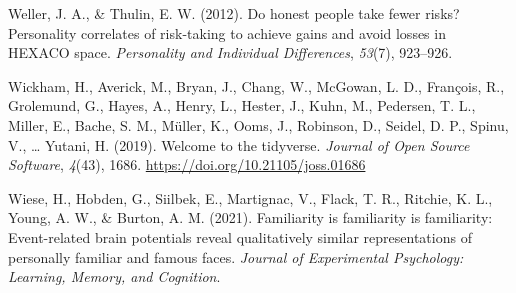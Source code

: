 \documentclass[
  man,floatsintext]{apa6}
\newlength{\cslhangindent}
\newlength{\cslentryspacingunit} %
\newenvironment{CSLReferences}[2] %
 {%
  \setlength{\parindent}{0pt}
  \ifodd #1
  \let\oldpar\par
  \def\par{\hangindent=\cslhangindent\oldpar}
  \fi
  \setlength{\parskip}{#2\cslentryspacingunit}
 }%
 {}
\begin{document}
\begin{CSLReferences}{1}{0}
\leavevmode{}%
Weller, J. A., \& Thulin, E. W. (2012). Do honest people take fewer risks? Personality correlates of risk-taking to achieve gains and avoid losses in HEXACO space. \emph{Personality and Individual Differences}, \emph{53}(7), 923--926.

\leavevmode{}%
Wickham, H., Averick, M., Bryan, J., Chang, W., McGowan, L. D., François, R., Grolemund, G., Hayes, A., Henry, L., Hester, J., Kuhn, M., Pedersen, T. L., Miller, E., Bache, S. M., Müller, K., Ooms, J., Robinson, D., Seidel, D. P., Spinu, V., \ldots{} Yutani, H. (2019). Welcome to the {tidyverse}. \emph{Journal of Open Source Software}, \emph{4}(43), 1686. \url{https://doi.org/10.21105/joss.01686}

\leavevmode{}%
Wiese, H., Hobden, G., Siilbek, E., Martignac, V., Flack, T. R., Ritchie, K. L., Young, A. W., \& Burton, A. M. (2021). Familiarity is familiarity is familiarity: Event-related brain potentials reveal qualitatively similar representations of personally familiar and famous faces. \emph{Journal of Experimental Psychology: Learning, Memory, and Cognition}.

\end{CSLReferences}


\clearpage
\renewcommand{\listfigurename}{Figure captions}
\end{document}
